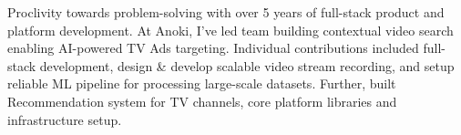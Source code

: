 
Proclivity towards problem-solving with over 5 years of full-stack product and platform development. At Anoki, I've led team building contextual video search enabling AI-powered TV Ads targeting.
Individual contributions included full-stack development, design \& develop scalable video stream recording, and setup reliable ML pipeline for processing large-scale datasets. 
Further, built Recommendation system for TV channels, core platform libraries and infrastructure setup.


